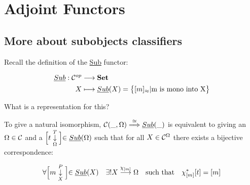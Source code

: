 \chapter{Adjoint Functors}

\section{More about subobjects classifiers}

Recall the definition of the \underline{Sub} functor: 

\begin{align*}
  \underline{Sub}: \mathcal{C}^{op} &\longrightarrow \textbf{Set} \\
  X &\longmapsto \underline{Sub}(X) = \bigl\{ [m]_{\approx} | 
    \textrm{m is mono into X} \bigl\} \\ 
\end{align*}

\begin{center}
\end{center}

What is a representation for this?
\begin{definition}
  To give a natural isomorphism, 
  $\mathcal{C}(\_,\Omega) \overset{\cong}{\Longrightarrow} \underline{Sub}(\_) $ 
  is equivalent to giving an 
  $\Omega \in \mathcal{C}$ 
  and a 
  $ \Bigl[t \underset{\Omega}{\overset{T}{\downarrow}} \Bigl] 
    \in \underline{Sub}(\Omega)$
  such that for all 
  $X \in \mathcal{C}^{\Omega}$
  there exists a bijective correspondence: 

  \begin{align*}
    \forall 
    \Bigl[m \underset{X}{\overset{P}{\downarrow}} \Bigl] 
    \in \underline{Sub}(X) \quad
    \exists! 
    X \overset{\chi_{[m]}}{\longrightarrow} \Omega \quad 
    \textrm{such that} \quad
    \chi_{[m]}^{*}[t] = [m]
  \end{align*}
\end{definition}

